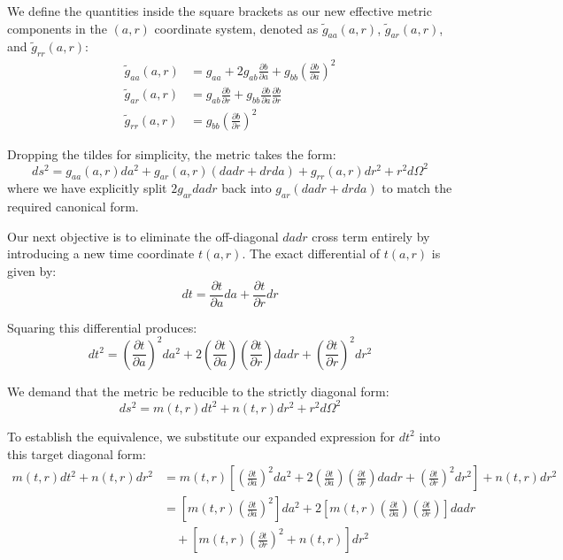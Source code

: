 \documentclass[11pt, a4paper]{report}
\begin{document}
We define the quantities inside the square brackets as our new effective metric components in the $(a,r)$ coordinate system, denoted as $\tilde{g}_{aa}(a,r)$, $\tilde{g}_{ar}(a,r)$, and $\tilde{g}_{rr}(a,r)$:
\begin{align}
\tilde{g}_{aa}(a,r) &= g_{aa} + 2g_{ab} \frac{\partial b}{\partial a} + g_{bb} \left( \frac{\partial b}{\partial a} \right)^2 \\
\tilde{g}_{ar}(a,r) &= g_{ab} \frac{\partial b}{\partial r} + g_{bb} \frac{\partial b}{\partial a} \frac{\partial b}{\partial r} \\
\tilde{g}_{rr}(a,r) &= g_{bb} \left( \frac{\partial b}{\partial r} \right)^2
\end{align}

Dropping the tildes for simplicity, the metric takes the form:
\begin{equation}
ds^{2}=g_{aa}(a,r)da^{2}+g_{ar}(a,r)(da dr+dr da)+g_{rr}(a,r)dr^{2}+r^{2}d\Omega^{2}
\end{equation}
where we have explicitly split $2g_{ar} da dr$ back into $g_{ar}(da dr + dr da)$ to match the required canonical form.

Our next objective is to eliminate the off-diagonal $da dr$ cross term entirely by introducing a new time coordinate $t(a,r)$. The exact differential of $t(a,r)$ is given by:
\begin{equation}
dt = \frac{\partial t}{\partial a} da + \frac{\partial t}{\partial r} dr
\end{equation}

Squaring this differential produces:
\begin{equation}
dt^{2} = \left( \frac{\partial t}{\partial a} \right)^2 da^{2} + 2 \left( \frac{\partial t}{\partial a} \right) \left( \frac{\partial t}{\partial r} \right) da dr + \left( \frac{\partial t}{\partial r} \right)^2 dr^{2}
\end{equation}

We demand that the metric be reducible to the strictly diagonal form:
\begin{equation}
ds^{2} = m(t,r)dt^{2} + n(t,r)dr^{2} + r^{2}d\Omega^{2}
\end{equation}

To establish the equivalence, we substitute our expanded expression for $dt^2$ into this target diagonal form:
\begin{align}
m(t,r)dt^{2} + n(t,r)dr^{2} &= m(t,r) \left[ \left( \frac{\partial t}{\partial a} \right)^2 da^{2} + 2 \left( \frac{\partial t}{\partial a} \right) \left( \frac{\partial t}{\partial r} \right) da dr + \left( \frac{\partial t}{\partial r} \right)^2 dr^{2} \right] + n(t,r)dr^{2} \nonumber \\
&= \left[ m(t,r) \left( \frac{\partial t}{\partial a} \right)^2 \right] da^{2} + 2 \left[ m(t,r) \left( \frac{\partial t}{\partial a} \right) \left( \frac{\partial t}{\partial r} \right) \right] da dr \nonumber \\
&\quad + \left[ m(t,r) \left( \frac{\partial t}{\partial r} \right)^2 + n(t,r) \right] dr^{2}
\end{align}
\end{document}
